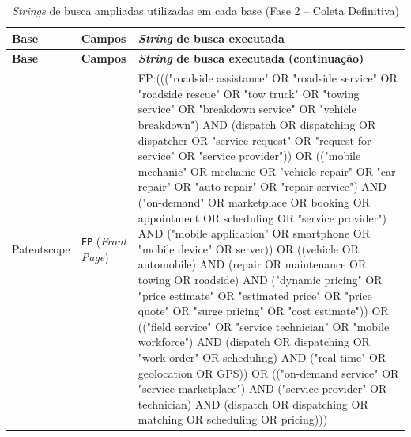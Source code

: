 \documentclass[12pt,a4paper]{article}
\begin{document}
\begingroup\footnotesize
\begin{longtable}{p{2.0cm}p{1.9cm}p{9.8cm}}
\caption{\textit{Strings} de busca ampliadas utilizadas em cada base (Fase 2 -- Coleta Definitiva)}\label{tab:string}\\
\toprule
\textbf{Base} & \textbf{Campos} & \textbf{\textit{String} de busca executada}\\
\midrule
\endfirsthead
\toprule
\textbf{Base} & \textbf{Campos} & \textbf{\textit{String} de busca executada (continuação)}\\
\midrule
\endhead
\bottomrule
\endfoot
Patentscope & \texttt{FP} (\textit{Front Page}) & {\ttfamily\sloppy FP:((("roadside assistance" OR "roadside service" OR "roadside rescue" OR "tow truck" OR "towing service" OR "breakdown service" OR "vehicle breakdown") AND (dispatch OR dispatching OR dispatcher OR "service request" OR "request for service" OR "service provider")) OR (("mobile mechanic" OR mechanic OR "vehicle repair" OR "car repair" OR "auto repair" OR "repair service") AND ("on-demand" OR marketplace OR booking OR appointment OR scheduling OR "service provider") AND ("mobile application" OR smartphone OR "mobile device" OR server)) OR ((vehicle OR automobile) AND (repair OR maintenance OR towing OR roadside) AND ("dynamic pricing" OR "price estimate" OR "estimated price" OR "price quote" OR "surge pricing" OR "cost estimate")) OR (("field service" OR "service technician" OR "mobile workforce") AND (dispatch OR dispatching OR "work order" OR scheduling) AND ("real-time" OR geolocation OR GPS)) OR (("on-demand service" OR "service marketplace") AND ("service provider" OR technician) AND (dispatch OR dispatching OR matching OR scheduling OR pricing)))}\\
\midrule

\end{longtable}
\end{document}
